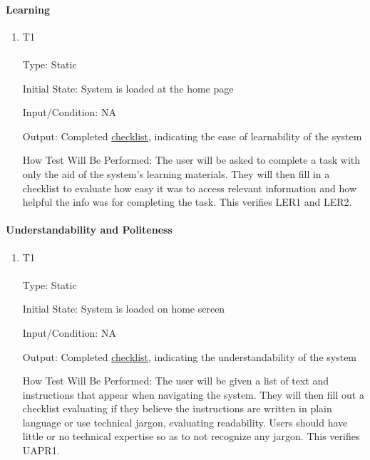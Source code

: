 \documentclass[12pt, titlepage]{article}
\begin{document}
\paragraph{Learning}
\begin{enumerate}
\item {T1\\}\\
\hypertarget{NFR11.3-TC1}{}
Type: Static

Initial State: System is loaded at the home page

Input/Condition: NA

Output: Completed \hyperlink{checklist-nfr11}{checklist}, indicating the ease of learnability of the system

How Test Will Be Performed: The user will be asked to complete a task with only the aid of the system's learning materials. They will then fill in a checklist to evaluate how easy it was to access relevant information and how helpful the info was for completing the task. This verifies LER1 and LER2.
\end{enumerate}
\paragraph{Understandability and Politeness}
\begin{enumerate}
\item {T1\\}\\
\hypertarget{NFR11.4-TC1}{}
Type: Static

Initial State: System is loaded on home screen

Input/Condition: NA

Output: Completed \hyperlink{checklist-nfr11}{checklist}, indicating the understandability of the system

How Test Will Be Performed: The user will be given a list of text and instructions that appear when navigating the system. They will then fill out a checklist evaluating if they believe the instructions are written in plain language or use technical jargon, evaluating readability. Users should have little or no technical expertise so as to not recognize any jargon. This verifies UAPR1.
\end{enumerate}
\end{document}
